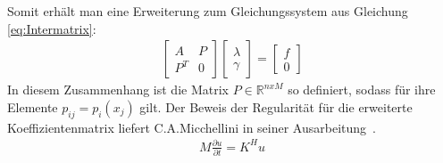 \documentclass[a4paper,11pt]{article}
\begin{document}
Somit erhält man eine Erweiterung zum Gleichungssystem aus Gleichung \eqref{eq:Intermatrix}:
\begin{align}
\begin{bmatrix}
 A & P \\ P^T & 0
\end{bmatrix}
\begin{bmatrix}
 \lambda  \\ \gamma
\end{bmatrix}
=
\begin{bmatrix}
 f  \\ 0
\end{bmatrix}\label{eq:Inter}
\end{align}
In diesem Zusammenhang ist die Matrix $P\in\mathbb{R}^{nxM}$ so definiert, sodass für ihre Elemente $p_{ij}=p_i(x_j)$ gilt. Der Beweis der Regularität für die erweiterte Koeffizientenmatrix liefert C.A.Micchellini in seiner Ausarbeitung~\cite{micchelli1984interpolation}.
\begin{align}
 M\frac{\partial u}{\partial t}=K^Hu\label{eq:algTrans}
\end{align}
\pagebreak
\end{document}

